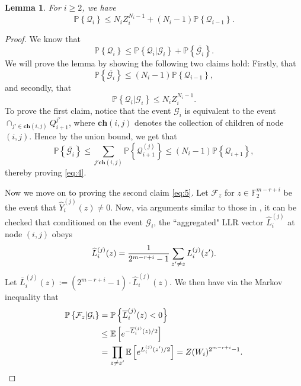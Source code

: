 \documentclass[conference,letterpaper]{IEEEtran}
\newcommand{\cG}{\ensuremath{\mathcal{G}}}
\newcommand{\cQ}{\ensuremath{\mathcal{Q}}}
\newcommand{\F}{{\mathbb F}}
\newcommand{\PR}[1]{{\mathbb{P}}\left\{ #1\right\}}
\newcommand{\E}[1]{\mathbb{E}\left[ #1\right]}
\newtheorem{lemma}[theorem]{Lemma}
\begin{document}
\begin{lemma}
 \label{lem:Qi-rec}
For $ i \geq  2 $, we have
    \begin{equation*}
        \PR{\cQ_i } \leq N_i Z_i^{N_i -1 }  + (N_i - 1 ) \PR{\cQ_{i-1}}.
    \end{equation*}
\end{lemma}
\begin{proof}
We know that
\begin{equation}
    \PR{\cQ_i } \leq \PR{\cQ_i | \cG_i } + \PR{\overline{\cG_i}}. 
\end{equation}
We will prove the lemma by showing the following two claims hold: Firstly, that
\begin{equation}
\label{eq:4}
    \PR{\overline{ \cG_i}} \leq (N_i -1 ) \PR{\cQ_{i-1}},
\end{equation}
and secondly, that 
\begin{equation}
\label{eq:5}
    \PR{\cQ_i | \cG_i } \leq N_i Z_i ^{ N_i -1 }.
\end{equation} 
To prove the first claim, notice that the event $\cG_i$ is equivalent to the event $ \cap_{j' \in \textbf{ch}( i,j ) }  Q_{i+1}^{j'}$, where $\textbf{ch}( i,j )$ denotes the collection of children of node $(i,j)$. Hence by the union bound, we get that
\begin{equation*}
    \PR{\overline{ \cG_i}} \leq \sum_{j'\textbf{ch}( i,j ) } \PR{\cQ_{i+1}^{(j)}} \leq ( N_i-1 ) \PR{\cQ_{i+1}},
 \end{equation*}
thereby proving \eqref{eq:4}.

Now we move on to proving the second claim \eqref{eq:5}. 
 Let $\mathcal{F}_z$ for $ z \in \F_2^{m-r+i}$ be the event that $\widehat{Y}_i^{(j)}(z) \neq 0$. Now, via arguments similar to those in \cite[Sec. IV-B]{rpa-analysis-isit}, it can be checked that conditioned on the event $\mathcal{G}_i$, the ``aggregated" LLR vector $\widehat{L}_i^{(j)}$ at node $(i,j)$ obeys
\begin{equation}
    \widehat{L}_i^{(j)}(z) = \frac{1}{2^{m-r+i }-1} \sum_{z'\neq z } L_i^{(j)}(z'). \notag
\end{equation}
Let $\overline{L}_i^{(j)}(z):= (2^{m-r+i }-1)\cdot \widehat{L}_i^{(j)}(z)$. We then have via the Markov inequality that
    \begin{align}
         \PR{\mathcal{F}_z| \cG_i} & =  \PR{ \overline{L}_i^{(j)}(z)  <0 }  \notag \\ 
        & \leq \E{e^{-\overline{L}_i^{(j)}(z)/2} } \notag\\
        &= \prod_{z\neq z'}  \E{e^{L_i^{(j)}(z')/2}} = Z( W_i ) ^{ 2^{m-r+i} -1 }. \notag
    \end{align}


\end{proof}
\end{document}
